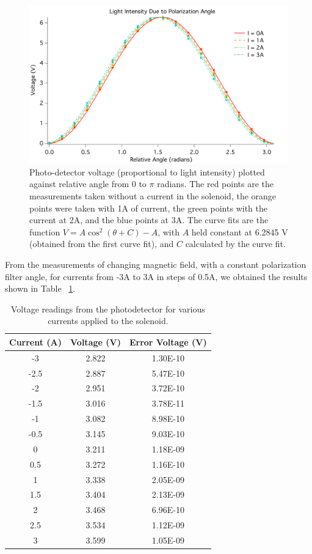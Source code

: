 \documentclass[prb,preprint]{revtex4-1}
\begin{document}
\begin{figure}[h!]
\centering
\includegraphics[width=6in]{V_ThetaRel_Plot.pdf}
\caption{Photo-detector voltage (proportional to light intensity) plotted against relative angle from 0 to $\pi$ radians.  The red points are the measurements taken without a current in the solenoid, the orange points were taken with 1A of current, the green points with the current at 2A, and the blue points at 3A.  The curve fits are the function $V = A \cos^{2}(\theta + C) - A$, with $A$ held constant at 6.2845 V (obtained from the first curve fit), and $C$ calculated by the curve fit. }
\label{V_ThetaRel_Plot}
\end{figure}

From the measurements of changing magnetic field, with a constant polarization filter angle, for currents from -3A to 3A in steps of 0.5A, we obtained the results shown in Table ~\ref{V_I_Table}. 

\begin{table}[h!]
\centering
\caption{Voltage readings from the photodetector for various currents applied to the solenoid. }
\begin{ruledtabular}
\begin{tabular}{c c c}
Current (A) & Voltage (V) & Error Voltage (V)\\
\hline	%
-3   & 2.822 & 1.30E-10 \\
-2.5 & 2.887 & 5.47E-10 \\
-2   & 2.951 & 3.72E-10 \\
-1.5 & 3.016 & 3.78E-11 \\
-1   & 3.082 & 8.98E-10 \\
-0.5 & 3.145 & 9.03E-10 \\
0    & 3.211 & 1.18E-09 \\
0.5  & 3.272 & 1.16E-10 \\
1    & 3.338 & 2.05E-09 \\
1.5  & 3.404 & 2.13E-09 \\
2    & 3.468 & 6.96E-10 \\
2.5  & 3.534 & 1.12E-09 \\
3    & 3.599 & 1.05E-09
\end{tabular}
\end{ruledtabular}
\label{V_I_Table}
\end{table}
\end{document}

